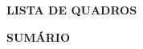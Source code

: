 \documentclass[12pt,oneside,a4paper,brazil,final]{abntex2}
\begin{document}
\vspace{\onelineskip}



\makeatletter


\makeatother



\cleardoublepage



\begin{center}

\textbf{LISTA DE QUADROS}

\end{center}

\vspace{\onelineskip}



\makeatletter


\makeatother



\cleardoublepage






\begin{center}

\textbf{SUMÁRIO}

\end{center}

\vspace{\onelineskip}



\makeatletter


\makeatother



\cleardoublepage



\textual

\OnehalfSpacing


\pagestyle{meuestilo}




\end{document}

